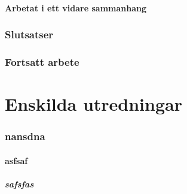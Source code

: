\documentclass{article}
\begin{document}
\subsection{Arbetat i ett vidare sammanhang}

\section{Slutsatser}

\section{Fortsatt arbete}
\newpage

\newpage

\newpage

\newpage

\newpage

\newpage

\newpage


\part{Enskilda utredningar}
\renewcommand{\thesection}{\Alph{section}}	

\section{nansdna}
\subsection{asfsaf}
\subsubsection{safsfas}
\end{document}
